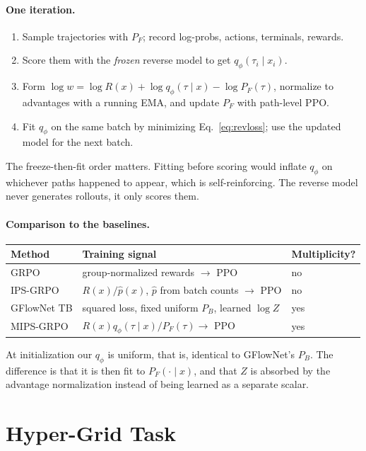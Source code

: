 \documentclass[11pt]{article}
\begin{document}
\paragraph{One iteration.}
\begin{enumerate}\itemsep2pt
\item Sample trajectories with $P_F$; record log-probs, actions, terminals, rewards.
\item Score them with the \emph{frozen} reverse model to get $q_\phi(\tau_i \mid x_i)$.
\item Form $\log w = \log R(x) + \log q_\phi(\tau \mid x) - \log P_F(\tau)$,
normalize to advantages with a running EMA, and update $P_F$ with path-level PPO.
\item Fit $q_\phi$ on the same batch by minimizing Eq.~\eqref{eq:revloss}; use the
updated model for the next batch.
\end{enumerate}
The freeze-then-fit order matters. Fitting before scoring would inflate
$q_\phi$ on whichever paths happened to appear, which is self-reinforcing. The
reverse model never generates rollouts, it only scores them.

\paragraph{Comparison to the baselines.}
\begin{center}
\begin{tabular}{lll}
\toprule
Method & Training signal & Multiplicity? \\
\midrule
GRPO & group-normalized rewards $\to$ PPO & no \\
IPS-GRPO & $R(x)/\hat{p}(x)$, $\hat{p}$ from batch counts $\to$ PPO & no \\
GFlowNet TB & squared loss, fixed uniform $P_B$, learned $\log Z$ & yes \\
MIPS-GRPO & $R(x) q_\phi(\tau\mid x)/P_F(\tau) \to$ PPO & yes \\
\bottomrule
\end{tabular}
\end{center}
At initialization our $q_\phi$ is uniform, that is, identical to GFlowNet's
$P_B$. The difference is that it is then fit to $P_F(\cdot \mid x)$, and that
$Z$ is absorbed by the advantage normalization instead of being learned as a
separate scalar.

\section{Hyper-Grid Task}
\label{sec:grid}
\end{document}
